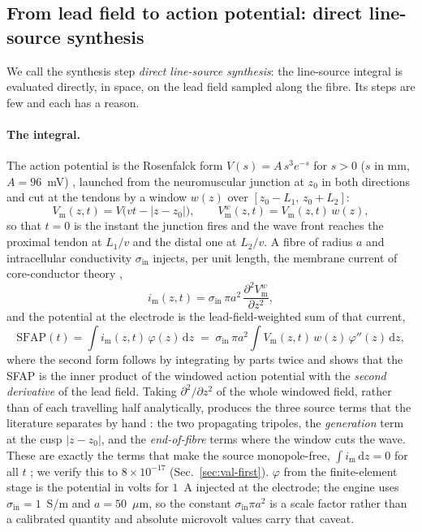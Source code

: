 \documentclass[11pt,a4paper]{article}
\newcommand{\dd}{\mathrm{d}}
\newcommand{\Vm}{V_{\mathrm{m}}}
\begin{document}
\subsection{From lead field to action potential: direct line-source synthesis}
\label{sec:direct}
We call the synthesis step \emph{direct line-source synthesis}: the line-source integral
is evaluated directly, in space, on the lead field sampled along the fibre. Its steps are
few and each has a reason.

\paragraph{The integral.} The action potential is the Rosenfalck form
$V(s) = A\,s^{3}e^{-s}$ for $s>0$ ($s$ in mm, $A = 96$~mV) \citep{rosenfalck1969intra},
launched from the neuromuscular junction at $z_{0}$ in both directions and cut at the
tendons by a window $w(z)$ over $[z_{0}-L_{1},\, z_{0}+L_{2}]$:
\begin{equation}
  \Vm(z,t) = V\!\big(v t - |z - z_{0}|\big), \qquad
  \Vm^{w}(z,t) = \Vm(z,t)\,w(z) ,
  \label{eq:wave}
\end{equation}
so that $t=0$ is the instant the junction fires and the wave front reaches the proximal
tendon at $L_{1}/v$ and the distal one at $L_{2}/v$. A fibre of radius $a$ and
intracellular conductivity $\sigma_{\mathrm{in}}$ injects, per unit length, the membrane
current of core-conductor theory \citep{rosenfalck1969intra, plonsey2007bioelectricity},
\begin{equation}
  i_{\mathrm m}(z,t) = \sigma_{\mathrm{in}}\,\pi a^{2}\,\frac{\partial^{2}\Vm^{w}}{\partial z^{2}} ,
  \label{eq:im}
\end{equation}
and the potential at the electrode is the lead-field-weighted sum of that current,
\begin{equation}
  \mathrm{SFAP}(t) = \int i_{\mathrm m}(z,t)\,\varphi(z)\,\dd z
  \;=\; \sigma_{\mathrm{in}}\,\pi a^{2}\int \Vm(z,t)\,w(z)\,\varphi''(z)\,\dd z ,
  \label{eq:sfap}
\end{equation}
where the second form follows by integrating by parts twice and shows that the SFAP is
the inner product of the windowed action potential with the \emph{second derivative} of
the lead field. Taking $\partial^{2}/\partial z^{2}$ of the whole windowed field, rather
than of each travelling half analytically, produces the three source terms that the
literature separates by hand \citep{dimitrov1998precise, kleinpenning1990equivalent}: the
two propagating tripoles, the \emph{generation} term at the cusp $|z-z_0|$, and the
\emph{end-of-fibre} terms where the window cuts the wave. These are exactly the terms
that make the source monopole-free, $\int i_{\mathrm m}\,\dd z = 0$ for all $t$
\citep{petersen2019comprehensive}; we verify this to $8\times10^{-17}$
(Sec.~\ref{sec:val-first}). $\varphi$ from the finite-element stage is the potential in
volts for $1$~A injected at the electrode; the engine uses $\sigma_{\mathrm{in}} = 1$~S/m
and $a = 50$~$\mu$m, so the constant $\sigma_{\mathrm{in}}\pi a^{2}$ is a scale factor
rather than a calibrated quantity and absolute microvolt values carry that caveat.
\end{document}

